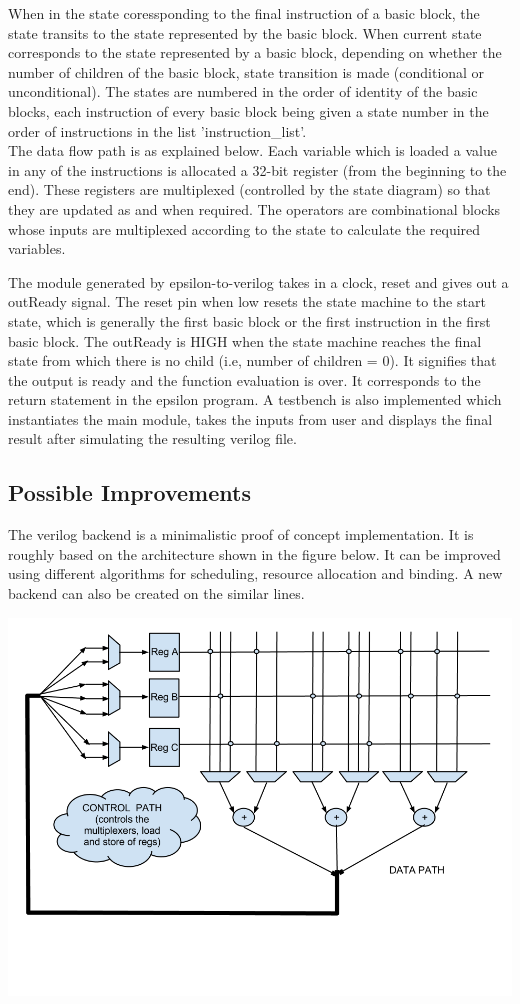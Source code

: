 \documentclass[titlepage]{article}
\begin{document}
        When in the  state coressponding to the final instruction of a basic block, the state transits to the state represented by the basic block. When current state corresponds to the state represented by a basic block, depending on whether the number of children of the basic block, state transition is made (conditional or unconditional). The states are numbered in the order of identity of the basic blocks, each instruction of every basic block being given a state number in the order of instructions in the list 'instruction\_list'.\\ The data flow path is as explained below. Each variable which is loaded a value in any of the instructions is allocated a 32-bit register (from the beginning to the end). These registers are multiplexed (controlled by the state diagram) so that they are updated as and when required. The operators are combinational blocks whose inputs are multiplexed according to the state to calculate the required variables.

        The module generated by epsilon-to-verilog takes in a clock, reset and gives out a outReady signal. The reset pin when low resets the state machine to the start state, which is generally the first basic block or the first instruction in the first basic block. The outReady is HIGH when the state machine reaches the final state from which there is no child (i.e, number of children = 0). It signifies that the output is ready and the function evaluation is over. It corresponds to the return statement in the epsilon program.
        A testbench is also implemented which instantiates the main module, takes the inputs from user and displays the final result after simulating the resulting verilog file.

    \subsection{Possible Improvements}
        The verilog backend is a minimalistic proof of concept implementation. It is roughly based on the architecture shown in the figure below. It can be improved using different algorithms for scheduling, resource allocation and binding. A new backend can also be created on the similar lines.
        
    \includegraphics[scale=0.5]{architecture.png}
        
\end{document}
